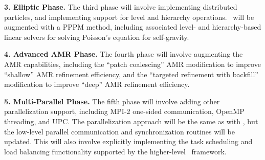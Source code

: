 \documentclass[10pt,twocolumn]{article}
\begin{document}
\textbf{3. Elliptic Phase.}  The third phase will involve implementing
distributed particles, and implementing support for level and
hierarchy operations.  \enzoii\ will be augmented with a PPPM method,
including associated level- and hierarchy-based linear solvers for
solving Poisson's equation for self-gravity.

\textbf{4. Advanced AMR Phase.} The fourth phase will involve augmenting the
AMR capabilities, including the ``patch coalescing'' AMR modification
to improve ``shallow'' AMR refinement efficiency, and the ``targeted
refinement with backfill'' modification to improve ``deep'' AMR
refinement efficiency.

\textbf{5. Multi-Parallel Phase.}  The fifth phase will involve adding
other parallelization support, including MPI-2 one-sided
communication, OpenMP threading, and UPC.  The parallelization
approach will be the same as with \charm, but the low-level parallel
communication and synchronization routines will be updated.  This will
also involve explicitly implementing the task scheduling and load
balancing functionality supported by the higher-level \charm\
framework.




\end{document}
